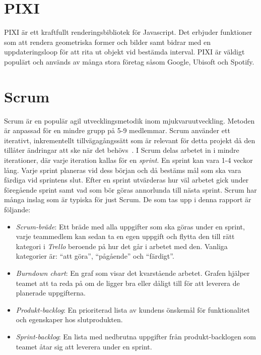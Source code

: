 \section{PIXI}
PIXI är ett kraftfullt renderingsbibliotek för Javascript. Det erbjuder funktioner som att rendera geometriska former och bilder samt bidrar med en uppdateringsloop för att rita ut objekt vid bestämda interval. PIXI är väldigt populärt och används av många stora företag såsom Google, Ubisoft och Spotify.~\cite{Pixi}

\section{Scrum}
\label{theory:scrum}
Scrum är en populär agil utvecklingsmetodik inom mjukvaruutveckling. Metoden är anpassad för en mindre grupp på 5-9 medlemmar. Scrum använder ett iterativt, inkrementellt tillvägagångssätt som är relevant för detta projekt då den tillåter ändringar att ske när det behövs~\cite{TheScrum}. I Scrum delas arbetet in i mindre iterationer, där varje iteration kallas för en \textit{sprint}. En sprint kan vara 1-4 veckor lång. Varje sprint planeras vid dess början och då bestäms mål som ska vara färdiga vid sprintens slut. Efter en sprint utvärderas hur väl arbetet gick under föregående sprint samt vad som bör göras annorlunda till nästa sprint. Scrum har många inslag som är typiska för just Scrum. De som tas upp i denna rapport är följande:

\begin{itemize}
	\item \textit{Scrum-bräde}: Ett bräde med alla uppgifter som ska göras under en sprint, varje teammedlem kan sedan ta en egen uppgift och flytta den till rätt kategori i \textit{Trello} beroende på hur det går i arbetet med den. Vanliga kategorier är: ``att göra'', ``pågående'' och ``färdigt''.

	\item \textit{Burndown chart}: En graf som visar det kvarstående arbetet. Grafen hjälper teamet att ta reda på om de ligger bra eller dåligt till för att leverera de planerade uppgifterna.

	\item \textit{Produkt-backlog}: En prioriterad lista av kundens önskemål för funktionalitet och egenskaper hos slutprodukten.

	\item \textit{Sprint-backlog}: En lista med nedbrutna uppgifter från produkt-backlogen som teamet åtar sig att leverera under en sprint.

\end{itemize}

